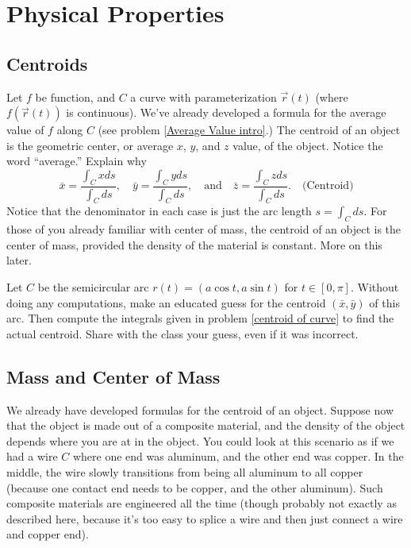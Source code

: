 \section{Physical Properties}

\subsection{Centroids}%
%
\begin{problem}[Centroid]\label{centroid of curve}
 Let $f$ be function, and $C$ a curve with parameterization $\vec r(t)$ (where $f(\vec r(t))$ is continuous).  We've already developed a formula for the average value of $f$ along $C$ (see problem \ref{Average Value intro}.) The centroid of an object is the geometric center, or average $x$, $y$, and $z$ value, of the object.  Notice the word ``average.''  Explain why 
$$
\bar x = \frac{\int_C x ds}{\int_C  ds},\quad
\bar y = \frac{\int_C y ds}{\int_C  ds},\quad 
\text{and}\quad
\bar z = \frac{\int_C z ds}{\int_C  ds}.  \quad\text{(Centroid)}
$$
Notice that the denominator in each case is just the arc length $s=\int_C ds$. 
For those of you already familiar with center of mass, the centroid of an object is the center of mass, provided the density of the material is constant. More on this later.
\end{problem}


\begin{problem}\label{semicircle centroid}
 Let $C$ be the semicircular arc $r(t)=(a\cos t, a\sin t)$ for $t\in[0,\pi]$. Without doing any computations, make an educated guess for the centroid $(\bar x, \bar y)$ of this arc.  Then compute the integrals given in problem \ref{centroid of curve} to find the actual centroid. Share with the class your guess, even if it was incorrect. 
\end{problem}

\subsection{Mass and Center of Mass}
 We already have developed formulas for the centroid of an object.  Suppose now that the object is made out of a composite material, and the density of the object depends where you are at in the object. You could look at this scenario as if we had a wire $C$ where one end was aluminum, and the other end was copper. In the middle, the wire slowly transitions from being all aluminum to all copper (because one contact end needs to be copper, and the other aluminum).  Such composite materials are engineered all the time (though probably not exactly as described here, because it's too easy to splice a wire and then just connect a wire and copper end).  

